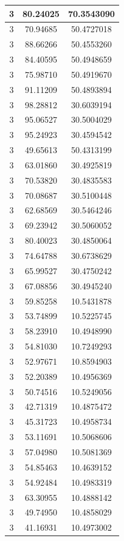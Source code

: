 \documentclass[
]{book}
\begin{document}
\begin{tabular}{c|c|c}
\hline
3 & 80.24025 & 70.3543090\\
\hline
3 & 70.94685 & 50.4727018\\
\hline
3 & 88.66266 & 50.4553260\\
\hline
3 & 84.40595 & 50.4948659\\
\hline
3 & 75.98710 & 50.4919670\\
\hline
3 & 91.11209 & 50.4893894\\
\hline
3 & 98.28812 & 30.6039194\\
\hline
3 & 95.06527 & 30.5004029\\
\hline
3 & 95.24923 & 30.4594542\\
\hline
3 & 49.65613 & 50.4313199\\
\hline
3 & 63.01860 & 30.4925819\\
\hline
3 & 70.53820 & 30.4835583\\
\hline
3 & 70.08687 & 30.5100448\\
\hline
3 & 62.68569 & 30.5464246\\
\hline
3 & 69.23942 & 30.5060052\\
\hline
3 & 80.40023 & 30.4850064\\
\hline
3 & 74.64788 & 30.6738629\\
\hline
3 & 65.99527 & 30.4750242\\
\hline
3 & 67.08856 & 30.4945240\\
\hline
3 & 59.85258 & 10.5431878\\
\hline
3 & 53.74899 & 10.5225745\\
\hline
3 & 58.23910 & 10.4948990\\
\hline
3 & 54.81030 & 10.7249293\\
\hline
3 & 52.97671 & 10.8594903\\
\hline
3 & 52.20389 & 10.4956369\\
\hline
3 & 50.74516 & 10.5249056\\
\hline
3 & 42.71319 & 10.4875472\\
\hline
3 & 45.31723 & 10.4958734\\
\hline
3 & 53.11691 & 10.5068606\\
\hline
3 & 57.04980 & 10.5081369\\
\hline
3 & 54.85463 & 10.4639152\\
\hline
3 & 54.92484 & 10.4983319\\
\hline
3 & 63.30955 & 10.4888142\\
\hline
3 & 49.74950 & 10.4858029\\
\hline
3 & 41.16931 & 10.4973002\\

\end{tabular}
\end{document}
